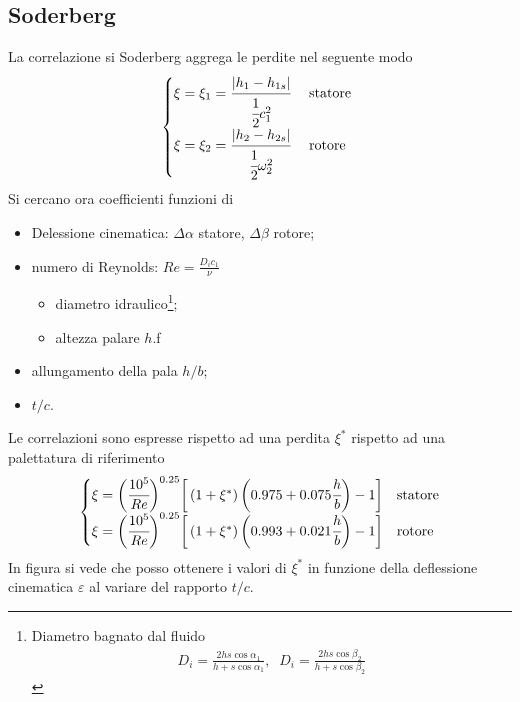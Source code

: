 \subsection{Soderberg}
La correlazione si Soderberg aggrega le perdite nel seguente modo
\begin{align*}
\begin{cases}
\xi = \xi_1 = \cfrac{|h_1 - h_{1s}|}{\cfrac{1}{2} c_1^2} & \mbox{ statore }\\
\xi = \xi_2 = \cfrac{|h_2 - h_{2s}|}{\cfrac{1}{2} \omega_2^2} & \mbox{ rotore }
\end{cases}
\end{align*}
Si cercano ora coefficienti funzioni di 
\begin{itemize}
\item Delessione cinematica: $\Delta \alpha$ statore, $\Delta \beta$ rotore;
\item numero di Reynolds: $Re = \frac{D_i c_1}{\nu}$
\begin{itemize}
\item diametro idraulico\footnote{Diametro bagnato dal fluido \begin{align*}
D_i = \frac{2 h s \cos \alpha_1}{h + s \cos \alpha_1}, \;\; D_i = \frac{2 h s \cos \beta_2}{h + s \cos \beta_2}
\end{align*}};
\item altezza palare $h$.f
\end{itemize}
\item allungamento della pala $h/b$;
\item $t/c$.
\end{itemize}
Le correlazioni sono espresse rispetto ad una perdita $\xi^*$ rispetto ad una palettatura di riferimento
\begin{align*}
\begin{cases}
\xi = \bigg( \cfrac{10^5}{Re} \bigg)^{0.25} \bigg[ \left( 1 + \xi^* \right) \bigg ( 0.975 + 0.075 \cfrac{h}{b} \bigg) -1 \bigg] & \mbox{statore} \\
\xi = \bigg( \cfrac{10^5}{Re} \bigg)^{0.25} \bigg[ \left( 1 + \xi^* \right) \bigg ( 0.993 + 0.021 \cfrac{h}{b} \bigg) -1 \bigg] & \mbox{rotore}
\end{cases}
\end{align*}
In figura si vede che posso ottenere i valori di $\xi^*$ in funzione della deflessione cinematica $\varepsilon$ al variare del rapporto $t/c$.
